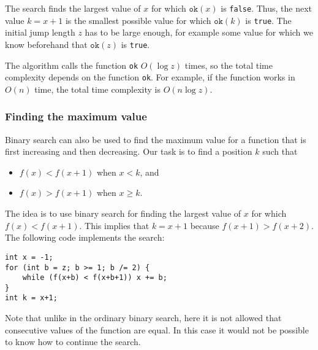 The search finds the largest value of $x$ for which
$\texttt{ok}(x)$ is \texttt{false}.
Thus, the next value $k=x+1$
is the smallest possible value for which
$\texttt{ok}(k)$ is \texttt{true}.
The initial jump length $z$ has to be
large enough, for example some value
for which we know beforehand that $\texttt{ok}(z)$ is \texttt{true}.

The algorithm calls the function \texttt{ok}
$O(\log z)$ times, so the total time complexity
depends on the function \texttt{ok}.
For example, if the function works in $O(n)$ time,
the total time complexity is $O(n \log z)$.

\subsubsection{Finding the maximum value}

Binary search can also be used to find
the maximum value for a function that is
first increasing and then decreasing.
Our task is to find a position $k$ such that

\begin{itemize}
\item
$f(x)<f(x+1)$ when $x<k$, and
\item
$f(x)>f(x+1)$ when $x \ge k$.
\end{itemize}

The idea is to use binary search
for finding the largest value of $x$
for which $f(x)<f(x+1)$.
This implies that $k=x+1$
because $f(x+1)>f(x+2)$.
The following code implements the search: 

\begin{lstlisting}
int x = -1;
for (int b = z; b >= 1; b /= 2) {
    while (f(x+b) < f(x+b+1)) x += b;
}
int k = x+1;
\end{lstlisting}

Note that unlike in the ordinary binary search,
here it is not allowed that consecutive values
of the function are equal.
In this case it would not be possible to know
how to continue the search.

